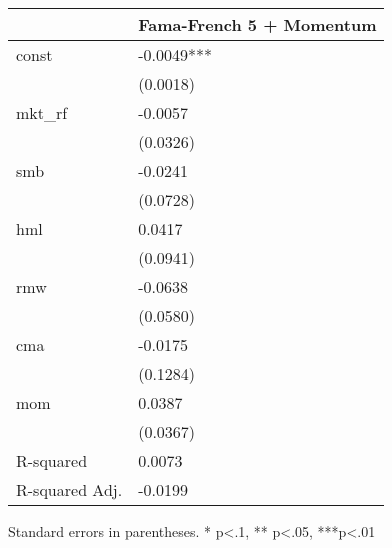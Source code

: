 \begin{table}
\caption{}
\label{}
\begin{center}
\begin{tabular}{ll}
\hline
               & Fama-French 5 + Momentum  \\
\hline
const          & -0.0049***                \\
               & (0.0018)                  \\
mkt\_rf        & -0.0057                   \\
               & (0.0326)                  \\
smb            & -0.0241                   \\
               & (0.0728)                  \\
hml            & 0.0417                    \\
               & (0.0941)                  \\
rmw            & -0.0638                   \\
               & (0.0580)                  \\
cma            & -0.0175                   \\
               & (0.1284)                  \\
mom            & 0.0387                    \\
               & (0.0367)                  \\
R-squared      & 0.0073                    \\
R-squared Adj. & -0.0199                   \\
\hline
\end{tabular}
\end{center}
\end{table}
\bigskip
Standard errors in parentheses. \newline 
* p<.1, ** p<.05, ***p<.01